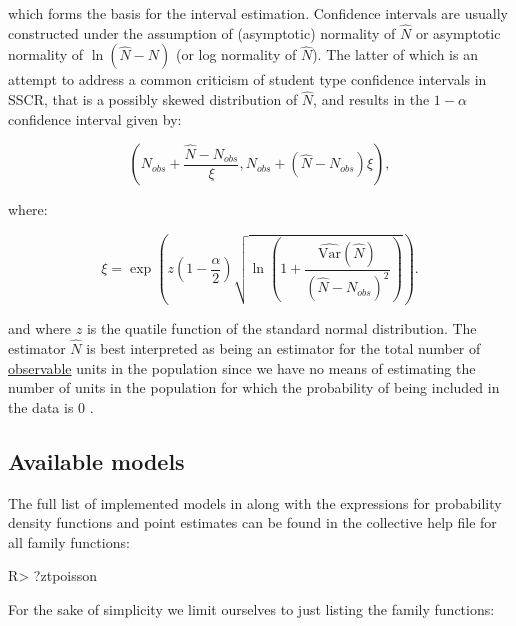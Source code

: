 \documentclass[
]{jss}
\newcommand{\1}{\mathcal{I}} \newcommand{\bZero}{\boldsymbol{0}}
\begin{document}
which forms the basis for the interval estimation. Confidence intervals
are usually constructed under the assumption of (asymptotic) normality
of \(\hat{N}\) or asymptotic normality of \(\ln(\hat{N}-N)\) (or log
normality of \(\hat{N}\)). The latter of which is an attempt to address
a common criticism of student type confidence intervals in SSCR, that is
a possibly skewed distribution of \(\hat{N}\), and results in the
\(1-\alpha\) confidence interval given by:

\begin{equation*}
  \left(N_{obs}+\frac{\hat{N}-N_{obs}}{\xi},N_{obs} +
  \left(\hat{N}-N_{obs}\right)\xi\right),
\end{equation*}

where:

\begin{equation*}
  \xi = \exp\left(z\left(1-\frac{\alpha}{2}\right)
  \sqrt{\ln\left(1+\frac{\widehat{\text{Var}}(\hat{N})}{\left(\hat{N}-N_{obs}\right)^{2}}\right)}\right).
\end{equation*}

and where \(z\) is the quatile function of the standard normal
distribution. The estimator \(\hat{N}\) is best interpreted as being an
estimator for the total number of \underline{observable} units in the
population since we have no means of estimating the number of units in
the population for which the probability of being included in the data
is \(0\) \citep[cf.][]{ztpoisson}.

\subsection{Available models}\label{available-models}

The full list of implemented models in  along with
the expressions for probability density functions and point estimates
can be found in the collective help file for all family functions:

\begin{CodeChunk}
\begin{CodeInput}
R> ?ztpoisson
\end{CodeInput}
\end{CodeChunk}

For the sake of simplicity we limit ourselves to just listing the family
functions:
\end{document}
